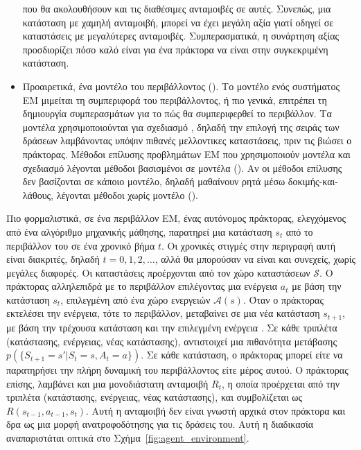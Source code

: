 \begin{itemize}
          που θα ακολουθήσουν και τις διαθέσιμες ανταμοιβές σε αυτές. Συνεπώς, μια κατάσταση
          με χαμηλή ανταμοιβή, μπορεί να έχει μεγάλη αξία γιατί οδηγεί σε καταστάσεις με μεγαλύτερες ανταμοιβές.
          Συμπερασματικά, η συνάρτηση αξίας προσδιορίζει πόσο καλό είναι για ένα πράκτορα να είναι στην συγκεκριμένη κατάσταση.
    \item Προαιρετικά, ένα μοντέλο του περιβάλλοντος (). Το μοντέλο ενός συστήματος ΕΜ μιμείται τη
          συμπεριφορά του περιβάλλοντος, ή πιο γενικά, επιτρέπει τη δημιουργία συμπερασμάτων για το πώς θα
          συμπεριφερθεί το περιβάλλον. Τα μοντέλα χρησιμοποιούνται για σχεδιασμό , δηλαδή την επιλογή της
          σειράς των δράσεων λαμβάνοντας υπόψιν πιθανές μελλοντικες καταστάσεις, πριν τις βιώσει ο πράκτορας.
          Μέθοδοι επίλυσης προβλημάτων ΕΜ που χρησιμοποιούν μοντέλα και σχεδιασμό λέγονται μέθοδοι βασισμένοι
          σε μοντέλα (). Αν οι μέθοδοι επίλυσης δεν βασίζονται σε κάποιο μοντέλο, δηλαδή μαθαίνουν ρητά μέσω
          δοκιμής-και-λάθους, λέγονται μέθοδοι χωρίς μοντέλο ().
\end{itemize}

Πιο φορμαλιστικά, σε ένα περιβάλλον ΕΜ, ένας αυτόνομος πράκτορας, ελεγχόμενος από ένα αλγόριθμο μηχανικής μάθησης,
παρατηρεί μια κατάσταση $s_t$ από το περιβάλλον του σε ένα χρονικό βήμα $t$. Οι χρονικές στιγμές στην περιγραφή αυτή είναι διακριτές,
δηλαδή $t=0,1,2,\ldots$, αλλά θα μπορούσαν να είναι και συνεχείς, χωρίς μεγάλες διαφορές. Οι καταστάσεις προέρχονται από τον
χώρο καταστάσεων $\mathcal{S}$. Ο πράκτορας αλληλεπιδρά με το περιβάλλον επιλέγοντας μια ενέργεια $a_t$ με βάση την κατάσταση
$s_t$, επιλεγμένη από ένα χώρο ενεργειών $\mathcal{A}(s)$. Όταν ο πράκτορας εκτελέσει την ενέργεια, τότε το περιβάλλον,
μεταβαίνει σε μια νέα κατάσταση $s_{t+1}$, με βάση την τρέχουσα κατάσταση και την επιλεγμένη
ενέργεια \cite{drlbs}. Σε κάθε τριπλέτα (κατάστασης, ενέργειας, νέας κατάστασης), αντιστοιχεί μια πιθανότητα μετάβασης
$p(\{S_{t+1}=s'|S_t=s, A_{t}=a\})$. Σε κάθε κατάσταση, ο πράκτορας μπορεί είτε να παρατηρήσει την πλήρη δυναμική του
περιβάλλοντος είτε μέρος αυτού. Ο πράκτορας επίσης, λαμβάνει και μια μονοδιάστατη ανταμοιβή $R_t$,
η οποία προέρχεται από την τριπλέτα (κατάστασης, ενέργειας, νέας κατάστασης), και συμβολίζεται ως
$R(s_{t-1}, a_{t-1}, s_t)$. Αυτή η ανταμοιβή δεν είναι γνωστή αρχικά στον πράκτορα και
δρα ως μια μορφή ανατροφοδότησης για τις δράσεις του.
Αυτή η διαδικασία αναπαριστάται οπτικά στο Σχήμα~\ref{fig:agent_environment}.


